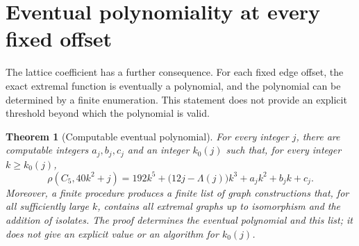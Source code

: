 \documentclass[11pt]{amsart}
\newtheorem{theorem}{Theorem}[section]
\theoremstyle{definition}
\theoremstyle{remark}
\begin{document}
\section{Eventual polynomiality at every fixed offset}
\label{sec:eventual-polynomial}

The lattice coefficient has a further consequence. For each fixed edge
offset, the exact extremal function is eventually a polynomial, and the
polynomial can be determined by a finite enumeration. This statement
does not provide an explicit threshold beyond which the polynomial is
valid.

\begin{theorem}[Computable eventual polynomial]
\label{thm:eventual-polynomial}
For every integer $j$, there are computable integers $a_j,b_j,c_j$ and
an integer $k_0(j)$ such that, for every integer $k\geq k_0(j)$,
\begin{equation}\tag{71}\label{eq:eventual-polynomial}
 \rho(C_5,40k^2+j)
 =192k^5+\bigl(12j-\Lambda(j)\bigr)k^3+a_jk^2+b_jk+c_j.
\end{equation}
Moreover, a finite procedure produces a finite list of graph
constructions that, for all sufficiently large $k$, contains all
extremal graphs up to isomorphism and the addition of isolates. The
proof determines the eventual polynomial and this list; it does not
give an explicit value or an algorithm for $k_0(j)$.
\end{theorem}
\end{document}
